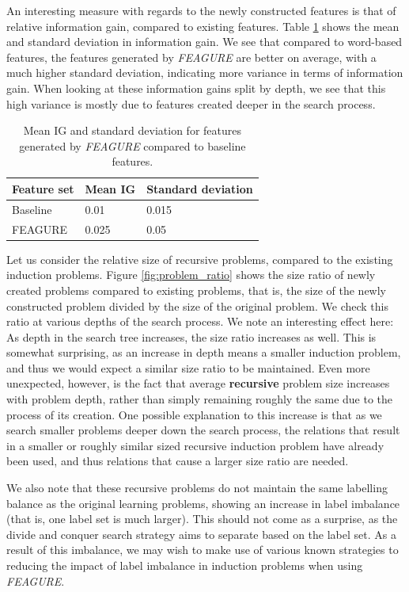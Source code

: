 \documentclass[twoside,11pt]{article}
\theoremstyle{definition}
\begin{document}
An interesting measure with regards to the newly constructed features is that of relative information gain, compared to existing features. Table \ref{table:ig_errorbars} shows the mean and standard deviation in information gain. We see that compared to word-based features, the features generated by \emph{FEAGURE} are better on average, with a much higher standard deviation, indicating more variance in terms of information gain. When looking at these information gains split by depth, we see that this high variance is mostly due to features created deeper in the search process.

\begin{table}[]
	\centering
	\caption{Mean IG and standard deviation for features generated by \emph{FEAGURE} compared to baseline features.}
	\label{table:ig_errorbars}
	\centering
	\begin{tabular}{|l || l | l|}
		\hline
		Feature set & Mean IG  & Standard deviation  \\ \hline
		 Baseline  & 0.01 & 0.015 \\
		\hline
		 FEAGURE & 0.025 & 0.05 \\
		\hline 
	\end{tabular}
\end{table}


Let us consider the relative size of recursive problems, compared to the existing induction problems. Figure \ref{fig:problem_ratio} shows the size ratio of newly created problems compared to existing problems, that is, the size of the newly constructed problem divided by the size of the original problem. We check this ratio at various depths of the search process. We note an interesting effect here:
As depth in the search tree increases, the size ratio increases as well. This is somewhat surprising, as an increase in depth means a smaller induction problem, and thus we would expect a similar size ratio to be maintained. Even more unexpected, however, is the fact that average \textbf{recursive} problem size increases with problem depth, rather than simply remaining roughly the same due to the process of its creation. One possible explanation to this increase is that as we search smaller problems deeper down the search process, the relations that result in a smaller or roughly similar sized recursive induction problem have already been used, and thus relations that cause a larger size ratio are needed.

We also note that these recursive problems do not maintain the same labelling balance as the original learning problems, showing an increase in label imbalance (that is, one label set is much larger). This should not come as a surprise, as the divide and conquer search strategy aims to separate based on the label set. As a result of this imbalance, we may wish to make use of various known strategies to reducing the impact of label imbalance in induction problems when using \emph{FEAGURE}.
\end{document}
